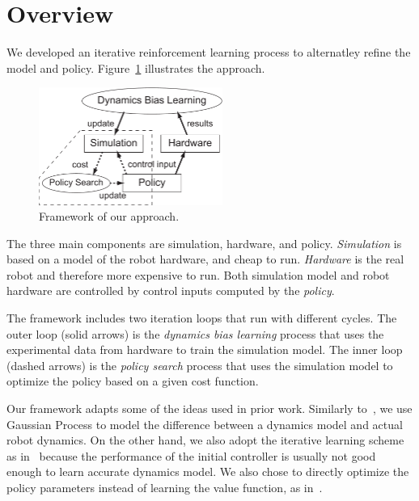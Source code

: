\section{Overview} \label{sec:learning_overview}

We developed an iterative reinforcement learning process to alternatley
refine the model and policy.
Figure~\ref{fig:learning_framework} illustrates the approach.

\begin{figure}[tb]
\begin{center}
\includegraphics[width=60mm]{eps/framework.pdf}
\caption{Framework of our approach.}
\label{fig:learning_framework}
\end{center}
\end{figure}

The three main components are simulation, hardware, and policy.
{\em Simulation} is based on a model of the robot hardware, and cheap to run.
{\em Hardware} is the real robot and therefore more expensive to run.
Both simulation model and robot hardware are controlled by control
inputs computed by the {\em policy}.

The framework includes two iteration loops that run with different
cycles. 
The outer loop (solid arrows) is the {\em dynamics bias learning}
process that uses the experimental data from hardware to train the
simulation model. 
The inner loop (dashed arrows) is the {\em policy search} process that
uses the simulation model to optimize the policy based on a given cost
function.

Our framework adapts some of the ideas used in prior work.
Similarly to~\cite{bib-ko-blimp}, we use Gaussian Process to model the
difference between a dynamics model and actual robot dynamics.
On the other hand, we also adopt the iterative learning scheme as
in~\cite{bib-abbeel-inaccurate} because the performance of the initial
controller is usually not good enough to learn accurate dynamics model.
We also chose to directly optimize the policy parameters instead of
learning the value function, as in~\cite{bib-deisenroth-data-efficient}.


